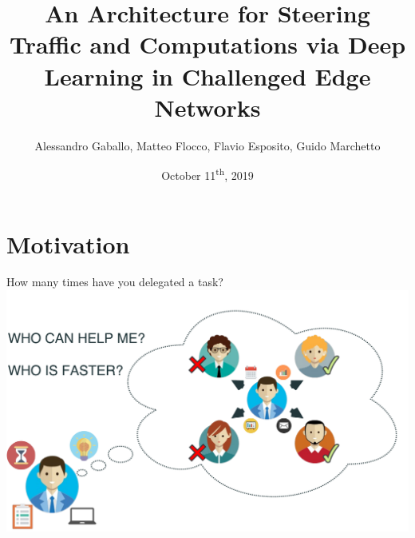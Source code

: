 \documentclass{beamer}
\title{An Architecture for Steering Traffic and Computations
via Deep Learning in Challenged Edge Networks}
\date{October 11\textsuperscript{th}, 2019}
\author{Alessandro Gaballo, Matteo Flocco, Flavio Esposito, Guido Marchetto}
\institute{Saint Louis University, Politecnico di Torino\par~\\~\\~\\~\\~\\~\\~\\~\\~\\~\\\tiny{\textit{Invited Paper}}}
\begin{document}
\maketitle
\section*{Motivation}
  \begin{frame}{How many times have you delegated a task?}
	\includegraphics[width=\textwidth]{img/delegation.pdf}  
  \end{frame}
  
\end{document}
